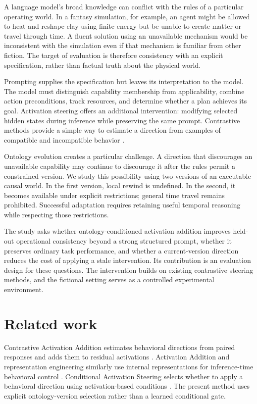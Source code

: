 \documentclass[preprint,12pt,numbers,nopreprintline]{elsarticle}
\begin{document}
A language model's broad knowledge can conflict with the rules of a particular operating world. In a fantasy simulation, for example, an agent might be allowed to heat and reshape clay using finite energy but be unable to create matter or travel through time. A fluent solution using an unavailable mechanism would be inconsistent with the simulation even if that mechanism is familiar from other fiction. The target of evaluation is therefore consistency with an explicit specification, rather than factual truth about the physical world.

Prompting supplies the specification but leaves its interpretation to the model. The model must distinguish capability membership from applicability, combine action preconditions, track resources, and determine whether a plan achieves its goal. Activation steering offers an additional intervention: modifying selected hidden states during inference while preserving the same prompt. Contrastive methods provide a simple way to estimate a direction from examples of compatible and incompatible behavior \citep{ref1,ref2,ref3}.

Ontology evolution creates a particular challenge. A direction that discourages an unavailable capability may continue to discourage it after the rules permit a constrained version. We study this possibility using two versions of an executable causal world. In the first version, local rewind is undefined. In the second, it becomes available under explicit restrictions; general time travel remains prohibited. Successful adaptation requires retaining useful temporal reasoning while respecting those restrictions.

The study asks whether ontology-conditioned activation addition improves held-out operational consistency beyond a strong structured prompt, whether it preserves ordinary task performance, and whether a current-version direction reduces the cost of applying a stale intervention. Its contribution is an evaluation design for these questions. The intervention builds on existing contrastive steering methods, and the fictional setting serves as a controlled experimental environment.

\section{Related work}

Contrastive Activation Addition estimates behavioral directions from paired responses and adds them to residual activations \citep{ref1}. Activation Addition and representation engineering similarly use internal representations for inference-time behavioral control \citep{ref2,ref3}. Conditional Activation Steering selects whether to apply a behavioral direction using activation-based conditions \citep{ref4}. The present method uses explicit ontology-version selection rather than a learned conditional gate.
\end{document}
